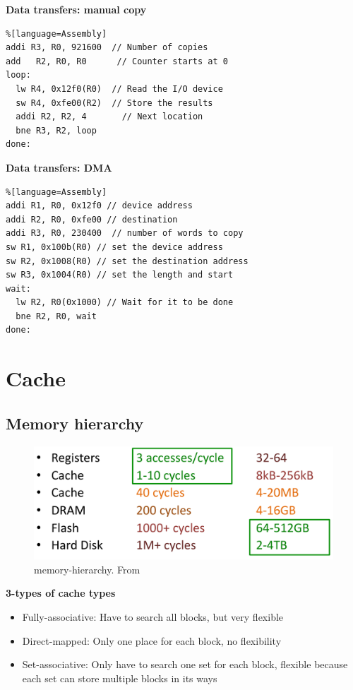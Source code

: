\textbf{Data transfers: manual copy}
\begin{lstlisting}%[language=Assembly]
addi R3, R0, 921600  // Number of copies
add   R2, R0, R0      // Counter starts at 0
loop:
  lw R4, 0x12f0(R0)  // Read the I/O device
  sw R4, 0xfe00(R2)  // Store the results
  addi R2, R2, 4       // Next location
  bne R3, R2, loop
done:
\end{lstlisting}


\textbf{Data transfers: DMA}
\begin{lstlisting}%[language=Assembly]
addi R1, R0, 0x12f0 // device address
addi R2, R0, 0xfe00 // destination
addi R3, R0, 230400  // number of words to copy
sw R1, 0x100b(R0) // set the device address
sw R2, 0x1008(R0) // set the destination address
sw R3, 0x1004(R0) // set the length and start
wait:
  lw R2, R0(0x1000) // Wait for it to be done
  bne R2, R0, wait
done:
\end{lstlisting}


\section{Cache}
\subsection{Memory hierarchy}

\begin{figure}[H]
    \centering
    \includegraphics[width=16cm]{image/memory-hierarchy.png}
    \caption{memory-hierarchy. From \cite{ca}}
\end{figure}

\textbf{3-types of cache types}
\begin{itemize}
\item  Fully-associative: Have to search all blocks, but very flexible 
\item  Direct-mapped: Only one place for each block, no flexibility
\item  Set-associative: Only have to search one set for each block,
  flexible because each set can store multiple blocks in its ways 
\end{itemize}

